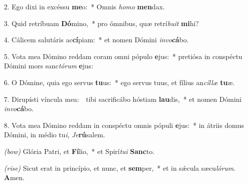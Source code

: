 2. Ego dixi in excéssu \textbf{me}o:~* Omnis \textit{ho}\textit{mo} \textbf{men}dax.

3. Quid retríbuam \textbf{Dó}mino,~* pro ómnibus, quæ retrí\textit{bu}\textit{it} \textbf{mi}hi?

4. Cálicem salutáris ac\textbf{cí}piam:~* et nomen Dómini \textit{in}\textit{vo}\textbf{cá}bo.

5. Vota mea Dómino reddam coram omni pópulo \textbf{e}jus:~* pretiósa in conspéctu Dómini mors sanc\textit{tó}\textit{rum} \textbf{e}jus:

6. O Dómine, quia ego servus \textbf{tu}us:~* ego servus tuus, et fílius an\textit{cíl}\textit{læ} \textbf{tu}æ.

7. Dirupísti víncula mea:~\GreDagger\ tibi sacrificábo hóstiam \textbf{lau}dis,~* et nomen Dómini \textit{in}\textit{vo}\textbf{cá}bo.

8. Vota mea Dómino reddam in conspéctu omnis pópuli \textbf{e}jus:~* in átriis domus Dómini, in médio tu\textit{i}, \textit{Je}\textbf{rú}salem.

\textit{(bow)} Glória Patri, et \textbf{Fí}lio,~* et Spirí\textit{tu}\textit{i} \textbf{Sanc}to.

\textit{(rise)}  Sicut erat in princípio, et nunc, et \textbf{sem}per,~* et in s\'{\ae}cula sæcu\textit{ló}\textit{rum}. \textbf{A}men.